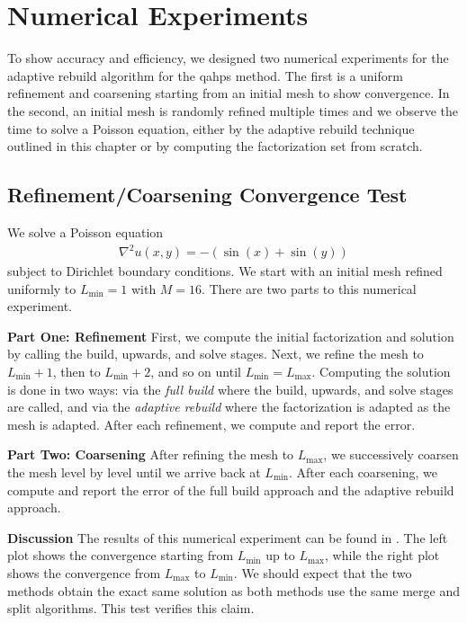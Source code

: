 \section{Numerical Experiments}

To show accuracy and efficiency, we designed two numerical experiments for the adaptive rebuild algorithm for the \gls{qahps} method. The first is a uniform refinement and coarsening starting from an initial mesh to show convergence. In the second, an initial mesh is randomly refined multiple times and we observe the time to solve a Poisson equation, either by the adaptive rebuild technique outlined in this chapter or by computing the factorization set from scratch.

\subsection{Refinement/Coarsening Convergence Test}
\label{sub:refinement-coarsening-test}

We solve a Poisson equation
\begin{align}
    \nabla^2 u(x, y) = -(\sin(x) + \sin(y))
\end{align}
subject to Dirichlet boundary conditions. We start with an initial mesh refined uniformly to $L_{\text{min}} = 1$ with $M = 16$. There are two parts to this numerical experiment.

{\bf Part One: Refinement} 
First, we compute the initial factorization and solution by calling the build, upwards, and solve stages. Next, we refine the mesh to $L_{\text{min}} + 1$, then to $L_{\text{min}} + 2$, and so on until $L_{\text{min}} = L_{\text{max}}$. Computing the solution is done in two ways: via the {\em full build} where the build, upwards, and solve stages are called, and via the {\em adaptive rebuild} where the factorization is adapted as the mesh is adapted. After each refinement, we compute and report the error.

{\bf Part Two: Coarsening}
After refining the mesh to $L_{\text{max}}$, we successively coarsen the mesh level by level until we arrive back at $L_{\text{min}}$. After each coarsening, we compute and report the error of the full build approach and the adaptive rebuild approach.

{\bf Discussion}
The results of this numerical experiment can be found in . The left plot shows the convergence starting from $L_{\text{min}}$ up to $L_{\text{max}}$, while the right plot shows the convergence from $L_{\text{max}}$ to $L_{\text{min}}$. We should expect that the two methods obtain the exact same solution as both methods use the same merge and split algorithms. This test verifies this claim.

